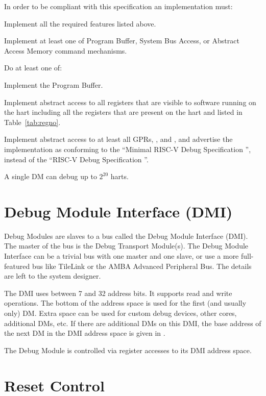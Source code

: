 \begin{steps}{In order to be compliant with this specification an
    implementation must:}
\item Implement all the required features listed above.
\item Implement at least one of Program Buffer, System Bus Access, or Abstract
    Access Memory command mechanisms.
\item
    \begin{steps}{Do at least one of:}
        \item Implement the Program Buffer.
        \item Implement abstract access to all registers that are visible to
            software running on the hart including all the registers that are
            present on the hart and listed in Table~\ref{tab:regno}.
        \item Implement abstract access to at least all GPRs, \Rdcsr, and
            \Rdpc, and advertise the implementation as conforming to the
            ``Minimal RISC-V Debug Specification \versionnum'', instead of the
            ``RISC-V Debug Specification \versionnum''.
    \end{steps}
\end{steps}

A single DM can debug up to $2^{20}$ harts.

\section{Debug Module Interface (DMI)} \label{dmi}

Debug Modules are slaves to a bus called the Debug Module Interface (DMI). The
master of the bus is the Debug Transport Module(s).
The Debug Module Interface can be a trivial bus with one master and one slave,
or use a more full-featured bus like TileLink or the AMBA Advanced Peripheral
Bus. The details are left to the system designer.

The DMI uses between 7 and 32 address bits.  It supports read and write
operations.  The bottom of the address space is
used for the first (and usually only) DM. Extra space can be used for custom
debug devices, other cores, additional DMs, etc. If there are additional DMs
on this DMI, the base address of the next DM in the DMI address space is given
in \Rnextdm.


The Debug Module is controlled via register accesses to its DMI address space.

\section{Reset Control} \label{reset}

